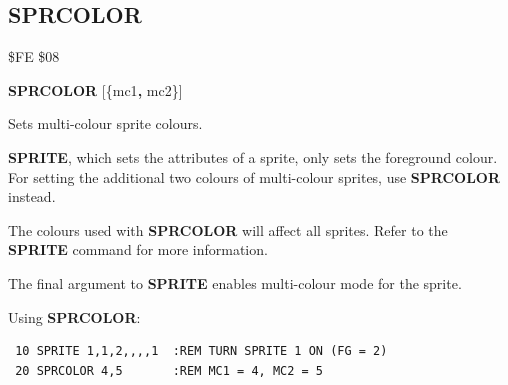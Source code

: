 \subsection{SPRCOLOR}
\begin{description}[leftmargin=2cm,style=nextline]
\item [Token:] \$FE \$08
\item [Format:] {\bf SPRCOLOR} [\{mc1{\bf,} mc2\}]
\item [Usage:]  Sets multi-colour sprite colours.

                {\bf SPRITE}, which sets the
                attributes of a sprite, only sets the foreground
                colour. For setting the additional two colours
                of multi-colour sprites, use {\bf SPRCOLOR} instead.

\item [Remarks:] The colours used with {\bf SPRCOLOR} will affect all sprites.
                 Refer to the {\bf SPRITE} command for more information.

                 The final argument to {\bf SPRITE} enables multi-colour mode
                 for the sprite.

\item [Example:] Using {\bf SPRCOLOR}:
\begin{tcolorbox}[colback=black,coltext=white]
\verbatimfont{\codefont}
\begin{verbatim}
 10 SPRITE 1,1,2,,,,1  :REM TURN SPRITE 1 ON (FG = 2)
 20 SPRCOLOR 4,5       :REM MC1 = 4, MC2 = 5
\end{verbatim}
\end{tcolorbox}
\end{description}


\newpage
